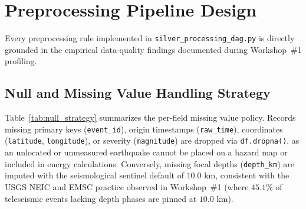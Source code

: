 \section{Preprocessing Pipeline Design}
Every preprocessing rule implemented in \texttt{silver\_processing\_dag.py} is directly grounded in the empirical data-quality findings documented during Workshop~\#1 profiling.

\subsection{Null and Missing Value Handling Strategy}
Table~\ref{tab:null_strategy} summarizes the per-field missing value policy. Records missing primary keys (\texttt{event\_id}), origin timestamps (\texttt{raw\_time}), coordinates (\texttt{latitude}, \texttt{longitude}), or severity (\texttt{magnitude}) are dropped via \texttt{df.dropna()}, as an unlocated or unmeasured earthquake cannot be placed on a hazard map or included in energy calculations. Conversely, missing focal depths (\texttt{depth\_km}) are imputed with the seismological sentinel default of $10.0\text{ km}$, consistent with the USGS NEIC and EMSC practice observed in Workshop~\#1 (where $45.1\%$ of teleseismic events lacking depth phases are pinned at $10.0\text{ km}$).

